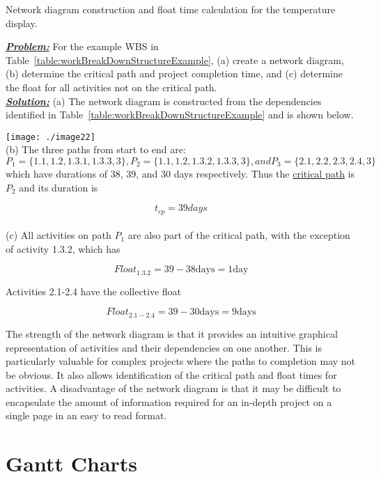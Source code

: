\begin{example}{Network diagram construction and float time
calculation for the temperature display.}
\label{example:projectManagementNetworkDiagram}

\emph{\textbf{\ul{Problem:}}} For the example WBS in 
Table~\ref{table:workBreakDownStructureExample}, (a)
create a network diagram, (b) determine the critical path and project
completion time, and (c) determine the float for all activities not on
the critical path.\\

\textbf{\ul{\emph{Solution:}}}
(a) The network diagram is constructed from the dependencies identified
in Table~\ref{table:workBreakDownStructureExample} and is shown below.

\texttt{[image: ./image22]} \\

(b) The three paths from start to end are:
$P_1 = \{1.1, 1.2, 1.3.1, 1.3.3, 3\}, P_2 = \{1.1, 1.2, 1.3.2, 1.3.3, 3\}, and
P_3 = \{2.1, 2.2, 2.3, 2.4, 3\}$
which have durations of 38, 39, and 30 days respectively. Thus the
\ul{critical path} is $P_2$ and its duration is

$$t_{cp} = 39 days$$ \\

(c) All activities on path $P_1$ are also part of
the critical path, with the exception of activity 1.3.2, which has

$$Float_{1.3.2} = 39 - 38 \text{days} = 1 \text{day}$$

Activities 2.1-2.4 have the collective float

$$Float_{2.1-2.4} = 39 - 30 \text{days} = 9 \text{days}$$
\end{example}

The strength of the network diagram is that it provides an intuitive
graphical representation of activities and their dependencies on one
another. This is particularly valuable for complex projects where the
paths to completion may not be obvious. It also allows identification of
the critical path and float times for activities. A disadvantage of the
network diagram is that it may be difficult to encapsulate the amount of
information required for an in-depth project on a single page in an easy
to read format.

\section{Gantt Charts}
\label{section:gantt-charts}

